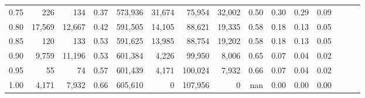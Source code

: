 \begin{tabular}{rrrrrrrrrrrrrrr}
0.75 &     226 &     134 &  0.37 &  573,936 &   31,674 &   75,954 &   32,002 &  0.50 &  0.30 &  0.29 &      0.09 \\
0.80 &  17,569 &  12,667 &  0.42 &  591,505 &   14,105 &   88,621 &   19,335 &  0.58 &  0.18 &  0.13 &      0.05 \\
0.85 &     120 &     133 &  0.53 &  591,625 &   13,985 &   88,754 &   19,202 &  0.58 &  0.18 &  0.13 &      0.05 \\
0.90 &   9,759 &  11,196 &  0.53 &  601,384 &    4,226 &   99,950 &    8,006 &  0.65 &  0.07 &  0.04 &      0.02 \\
0.95 &      55 &      74 &  0.57 &  601,439 &    4,171 &  100,024 &    7,932 &  0.66 &  0.07 &  0.04 &      0.02 \\
1.00 &   4,171 &   7,932 &  0.66 &  605,610 &        0 &  107,956 &        0 &   nan &  0.00 &  0.00 &      0.00 \\
\bottomrule
\end{tabular}
